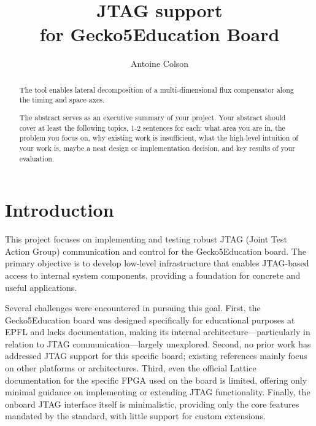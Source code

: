 \documentclass[a4paper,11pt,oneside]{report}
\title{JTAG support \\for Gecko5Education Board}
\author{Antoine Colson}
\newcommand{\boardName}{Gecko5Education \xspace}
\begin{document}
\maketitle

\begin{abstract}
The \sysname tool enables lateral decomposition of a multi-dimensional
flux compensator along the timing and space axes.

The abstract serves as an executive summary of your project.
Your abstract should cover at least the following topics, 1-2 sentences for
each: what area you are in, the problem you focus on, why existing work is
insufficient, what the high-level intuition of your work is, maybe a neat
design or implementation decision, and key results of your evaluation.
\end{abstract}


\maketoc

\chapter{Introduction}

This project focuses on implementing and testing robust JTAG (Joint Test Action Group) communication and control for the \boardName board.
The primary objective is to develop low-level infrastructure that enables JTAG-based access to internal system components, providing a foundation for concrete and useful applications.

Several challenges were encountered in pursuing this goal.
First, the \boardName board was designed specifically for educational purposes at EPFL and lacks documentation, 
making its internal architecture—particularly in relation to JTAG communication—largely unexplored.
Second, no prior work has addressed JTAG support for this specific board; existing references mainly focus on other platforms or architectures.
Third, even the official Lattice documentation for the specific FPGA used on the board is limited, 
offering only minimal guidance on implementing or extending JTAG functionality.
Finally, the onboard JTAG interface itself is minimalistic, 
providing only the core features mandated by the standard, with little support for custom extensions.
\end{document}
